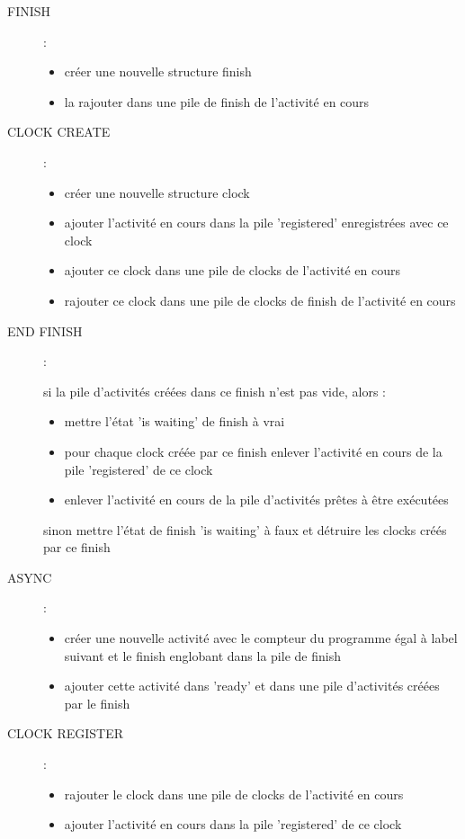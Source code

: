 \documentclass[12pt]{scrartcl}
\begin{document}
\begin{description}

  \item[FINISH] : 
  \begin{itemize} 
    \item créer une nouvelle structure finish
    \item la rajouter dans une pile de finish de l'activité en cours
  \end{itemize} 

  \item[CLOCK CREATE] : 
    \begin{itemize} 
       \item créer une nouvelle structure clock
       \item ajouter l'activité en cours dans la pile 'registered' enregistrées avec ce clock
       \item ajouter ce clock dans une pile de clocks de l'activité en cours
       \item rajouter ce clock dans une pile de clocks de finish de l'activité en cours
    \end{itemize} 

  \item[END FINISH] : 
    
    si la pile d'activités créées dans ce finish n'est pas vide, alors : 
    \begin{itemize} 
      \item mettre l'état 'is waiting' de finish à vrai
      \item pour chaque clock créée par ce finish enlever l'activité en cours de la pile 'registered' de ce clock
      \item enlever l'activité en cours de la pile d'activités prêtes à être exécutées
    \end{itemize} 
    sinon mettre l'état de finish 'is waiting' à faux et détruire les clocks créés par ce finish

  \item[ASYNC] : 
    \begin{itemize} 
      \item créer une nouvelle activité avec le compteur du programme égal à label suivant et le finish englobant dans la pile de finish
      \item ajouter cette activité dans 'ready' et dans une pile d'activités créées par le finish
    \end{itemize} 
  
   \item[CLOCK REGISTER]:
    \begin{itemize} 
      \item rajouter le clock dans une pile de clocks de l'activité en cours
      \item ajouter l'activité en cours dans la pile 'registered' de ce clock
    \end{itemize} 


\end{description}
\end{document}
